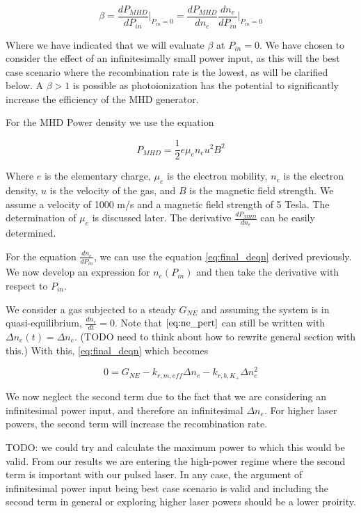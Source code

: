 \begin{equation}
  \label{eq:beta_def}
\beta = \frac{dP_{MHD}}{dP_{in}} \Big|_{P_{in}=0} = \frac{dP_{MHD}}{dn_{e}}\frac{dn_{e}}{dP_{in}}\Big|_{P_{in}=0}
\end{equation}

Where we have indicated that we will evaluate $\beta$ at $P_{in} = 0$. We have chosen to consider the effect of an infinitesimally small power input, as this will the best case scenario where the recombination rate is the lowest, as will be clarified below. A $\beta > 1$ is possible as photoionization has the potential to significantly increase the efficiency of the MHD generator. 

For the MHD Power density we use the equation

\begin{equation}
  \label{eq:mhd_power}
P_{MHD} = \frac{1}{2} e \mu_e n_e u^2 B^2
\end{equation}

Where $e$ is the elementary charge, $\mu_e$ is the electron mobility, $n_e$ is the electron density, $u$ is the velocity of the gas, and $B$ is the magnetic field strength. We assume a velocity of 1000 m/s and a magnetic field strength of 5 Tesla. The determination of $\mu_e$ is discussed later. The derivative $\frac{dP_{MHD}}{dn_{e}}$ can be easily determined. 

For the equation $\frac{dn_{e}}{dP_{in}}$, we can use the equation \ref{eq:final_deqn} derived previously. We now develop an expression for $n_{e}(P_{in})$ and then take the derivative with respect to $P_{in}$.

We consider a gas subjected to a steady $G_{NE}$ and assuming the system is in quasi-equilibrium, $\frac{dn_{e}}{dt} = 0$. Note that $\ref{eq:ne_pert}$ can still be written with $\Delta n_e(t) = \Delta n_{e}$. (TODO need to think about how to rewrite general section with this.) With this, \ref{eq:final_deqn} which becomes

\begin{equation}
0 = G_{NE} - k_{r, m, eff}\Delta n_{e} - k_{r, b, K_{+}}\Delta n_{e}^2
\end{equation}

We now neglect the second term due to the fact that we are considering an infinitesimal power input, and therefore an infinitesimal $\Delta n_{e}$. For higher laser powers, the second term will increase the recombination rate. 

TODO: we could try and calculate the maximum power to which this would be valid. From our results we are entering the high-power regime where the second term is important with our pulsed laser. In any case, the argument of infinitesimal power input being best case scenario is valid and including the second term in general or exploring higher laser powers should be a lower proirity.

